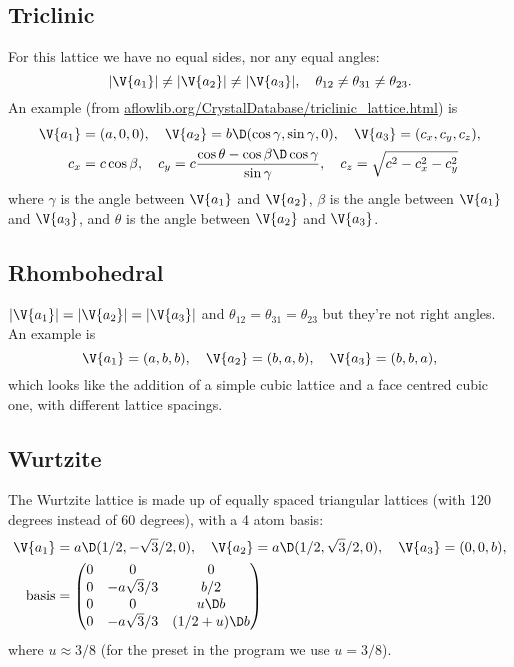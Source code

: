 \documentclass[main.tex]{subfiles}
\begin{document}
	\subsection*{Triclinic}
	For this lattice we have no equal sides, nor any equal angles:
	\begin{equation*}
	|\V{a_1}| \neq |\V{a_2}| \neq |\V{a_3}|, \quad \theta_{12} \neq \theta_{31} \neq \theta_{23}.
	\end{equation*}
	An example (from \url{aflowlib.org/CrystalDatabase/triclinic_lattice.html}) is
	\begin{align*}
		\V{a_1} &= (a, 0, 0), \quad \V{a_2} = b\D (\cos \gamma, \sin \gamma, 0), \quad \V{a_3} = (c_x, c_y, c_z), \\
		c_x &= c \cos \beta, \quad c_y = c \frac{\cos \theta - \cos \beta \D \cos \gamma}{\sin \gamma}, \quad c_z = \sqrt{c^2 - c_x^2 - c_y^2}
	\end{align*}
	where $ \gamma $ is the angle between $ \V{a_1} $ and $ \V{a_2} $, $ \beta $ is the angle between $ \V{a_1} $ and $ \V{a_3} $, and $ \theta $ is the angle between $ \V{a_2} $ and $ \V{a_3} $.
	
	
	\subsection*{Rhombohedral}
	$|\V{a_1}| = |\V{a_2}| = |\V{a_3}|$ and $\theta_{12} = \theta_{31} = \theta_{23}$ but they're not right angles. An example is
	\begin{equation*}
		\V{a_1} = (a,b,b), \quad \V{a_2} = (b,a,b), \quad \V{a_3} = (b,b,a),
	\end{equation*}
	which looks like the addition of a simple cubic lattice and a face centred cubic one, with different lattice spacings.
	
	\subsection*{Wurtzite}
	The Wurtzite lattice is made up of equally spaced triangular lattices (with 120 degrees instead of 60 degrees), with a 4 atom basis:
	\begin{align*}
		\V{a_1} &= a \D (1/2, -\sqrt{3}/2, 0), \quad \V{a_2} = a \D (1/2, \sqrt{3}/2, 0), \quad \V{a_3} = (0,0, b), \\
		\text{basis} &= \begin{pmatrix}
		0 & 0 & 0 \\
		0 & -a \sqrt{3}/3 & b/2 \\
		0 & 0 & u\D b \\
		0 & -a \sqrt{3}/3 & (1/2 + u) \D b
		\end{pmatrix}
	\end{align*}
	where $ u \approx 3/8 $ (for the preset in the program we use $ u=3/8 $).
	
\end{document}

